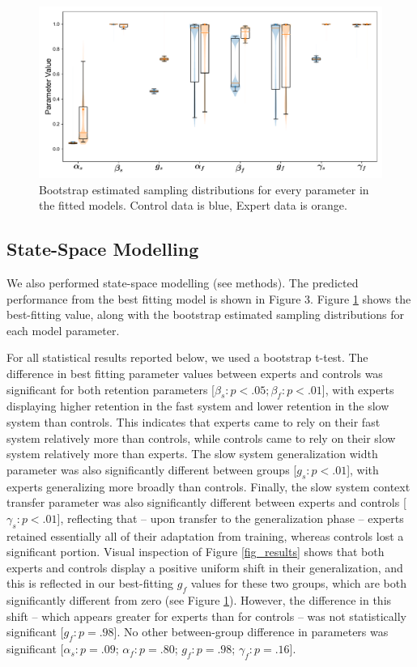 \documentclass[man, 11pt, longtable, floatsintext, notab]{apa6}
\begin{document}
\begin{figure}[h]
  \centering
  \includegraphics[width=1.0\textwidth]{figures/fig_3.pdf}
  \caption{\scriptsize
    Bootstrap estimated sampling distributions for every
    parameter in the fitted models. Control data is blue, Expert
    data is orange.
  }
  \label{fig_params}
\end{figure}
\subsection{State-Space Modelling}
We also performed state-space modelling (see methods). The
predicted performance from the best fitting model is shown
in Figure 3. Figure \ref{fig_params} shows the best-fitting
value, along with the bootstrap estimated sampling
distributions for each model parameter.

For all statistical results reported below, we used a
bootstrap t-test. The difference in best fitting parameter
values between experts and controls was significant for both
retention parameters [$\beta_s: p<.05; \beta_f: p<.01$],
with experts displaying higher retention in the fast system
and lower retention in the slow system than controls. This
indicates that experts came to rely on their fast system
relatively more than controls, while controls came to rely
on their slow system relatively more than experts. The slow
system generalization width parameter was also significantly
different between groups [$g_s: p<.01$], with experts
generalizing more broadly than controls. Finally, the slow
system context transfer parameter was also significantly
different between experts and controls [$\gamma_s: p <
.01$], reflecting that -- upon transfer to the
generalization phase -- experts retained essentially all of
their adaptation from training, whereas controls lost a
significant portion. Visual inspection of Figure
\ref{fig_results} shows that both experts and controls
display a positive uniform shift in their generalization,
and this is reflected in our best-fitting $g_f$ values for
these two groups, which are both significantly different
from zero (see Figure \ref{fig_params}). However, the
difference in this shift -- which appears greater for
experts than for controls -- was not statistically
significant [$g_f: p=.98$]. No other between-group
difference in parameters was significant [$\alpha_s: p=.09$;
$\alpha_f: p=.80$; $g_f: p=.98$; $\gamma_f: p=.16$].
\end{document}

